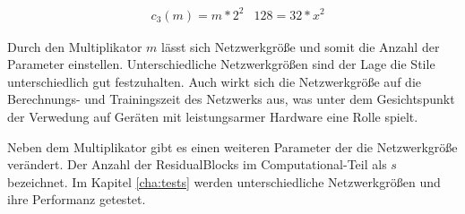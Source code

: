 \begin{align}
	& c_{3}(m) = m * 2^{2}
	& 128 = 32 * x^{2}
\end{align}

Durch den Multiplikator $ m $ lässt sich Netzwerkgröße und somit die Anzahl der Parameter einstellen. Unterschiedliche Netzwerkgrößen sind der Lage die Stile unterschiedlich gut festzuhalten. Auch wirkt sich die Netzwerkgröße auf die Berechnungs- und Trainingszeit des Netzwerks aus, was unter dem Gesichtspunkt der Verwedung auf Geräten mit leistungsarmer Hardware eine Rolle spielt.

Neben dem Multiplikator gibt es einen weiteren Parameter der die Netzwerkgröße verändert. Der Anzahl der ResidualBlocks im Computational-Teil als $ s $ bezeichnet. Im Kapitel \ref{cha:tests} werden unterschiedliche Netzwerkgrößen und ihre Performanz getestet.